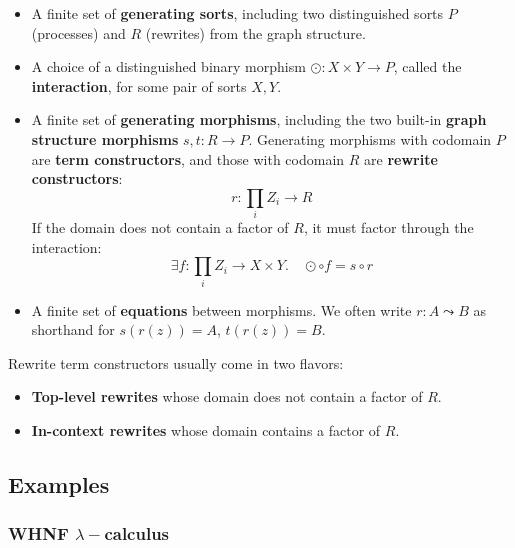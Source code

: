 \documentclass{article}
\begin{document}
\begin{itemize}
    \item A finite set of \textbf{generating sorts}, including two distinguished sorts $P$ (processes) and $R$ (rewrites) from the graph structure.
    \item A choice of a distinguished binary morphism $\odot : X \times Y \to P$, called the \textbf{interaction}, for some pair of sorts $X, Y$.
    \item A finite set of \textbf{generating morphisms}, including the two built-in \textbf{graph structure morphisms} $s, t : R \to P$. Generating morphisms with codomain $P$ are \textbf{term constructors}, and those with codomain $R$ are \textbf{rewrite constructors}:
    \[
    r : \prod_i Z_i \to R
    \]
    If the domain does not contain a factor of $R$, it must factor through the interaction:
    \[
    \exists f : \prod_i Z_i \to X \times Y. \quad \odot \circ f = s \circ r
    \]
    \item A finite set of \textbf{equations} between morphisms. We often write $r : A \leadsto B$ as shorthand for $s(r(z)) = A$, $t(r(z)) = B$.
\end{itemize}

Rewrite term constructors usually come in two flavors:

\begin{itemize}
    \item \textbf{Top-level rewrites} whose domain does not contain a factor of $R$.
    \item \textbf{In-context rewrites} whose domain contains a factor of $R$.
\end{itemize}

\subsection{Examples}
\subsubsection{WHNF $\lambda-$calculus}
\end{document}
